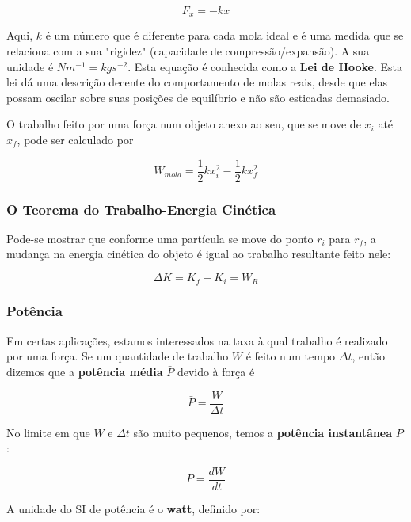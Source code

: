 \begin{equation}
    F_x=-kx
\end{equation}

Aqui, $k$ é um número que é diferente para cada mola ideal e é uma medida que se relaciona com a sua "rigidez" (capacidade de compressão/expansão). A sua unidade é $Nm^{-1}=kgs^{-2}$. Esta equação é conhecida como a \textbf{Lei de Hooke}. Esta lei dá uma descrição decente do comportamento de molas reais, desde que elas possam oscilar sobre suas posições de equilíbrio e não são esticadas demasiado.

O trabalho feito por uma força num objeto anexo ao seu, que se move de $x_i$ até $x_f$, pode ser calculado por

\begin{equation}
    W_{mola}=\frac{1}{2}kx_i^2-\frac{1}{2}kx_f^2
\end{equation}

\subsubsection{O Teorema do Trabalho-Energia Cinética}
Pode-se mostrar que conforme uma partícula se move do ponto $r_i$ para $r_f$, a mudança na energia cinética do objeto é igual ao trabalho resultante feito nele:

\begin{equation}
    \Delta K=K_f-K_i=W_{R}
\end{equation}

\subsubsection{Potência}
Em certas aplicações, estamos interessados na taxa à qual trabalho é realizado por uma força. Se um quantidade de trabalho $W$ é feito num tempo $\Delta t$, então dizemos que a \textbf{potência média} $\bar{P}$ devido à força é

\begin{equation}
    \bar{P}=\frac{W}{\Delta t}
\end{equation}

No limite em que $W$ e $\Delta t$ são muito pequenos, temos a \textbf{potência instantânea} $P$:

\begin{equation}
    P=\frac{dW}{dt}
\end{equation}

A unidade do SI de potência é o \textbf{watt}, definido por:

